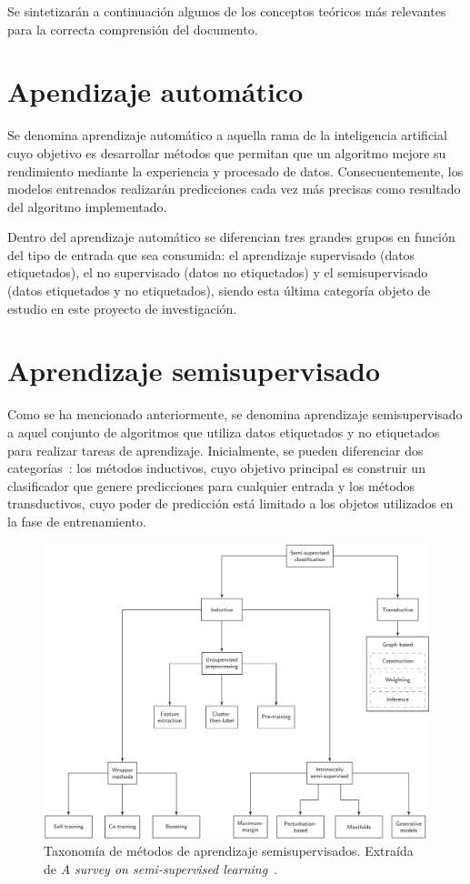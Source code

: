 
Se sintetizarán a continuación algunos de los conceptos teóricos más relevantes para la correcta comprensión del documento.

\section{Apendizaje automático}

Se denomina aprendizaje automático a aquella rama de la inteligencia artificial cuyo objetivo es desarrollar métodos que permitan que un algoritmo mejore su rendimiento mediante la experiencia y procesado de datos. Consecuentemente, los modelos entrenados realizarán predicciones cada vez más precisas como resultado del algoritmo implementado.

Dentro del aprendizaje automático se diferencian tres grandes grupos en función del tipo de entrada que sea consumida: el aprendizaje supervisado (datos etiquetados), el no supervisado (datos no etiquetados) y el semisupervisado (datos etiquetados y no etiquetados), siendo esta última categoría objeto de estudio en este proyecto de investigación. 

\section{Aprendizaje semisupervisado}

Como se ha mencionado anteriormente, se denomina aprendizaje semisupervisado a aquel conjunto de algoritmos que utiliza datos etiquetados y no etiquetados para realizar tareas de aprendizaje. Inicialmente, se pueden diferenciar dos categorías~\cite{engelen2020surveyOnSemiSupervised}: los métodos inductivos, cuyo objetivo principal es construir un clasificador que genere predicciones para cualquier entrada y los métodos transductivos, cuyo poder de predicción está limitado a los objetos utilizados en la fase de entrenamiento.


\begin{figure}[h]
\caption{Taxonomía de métodos de aprendizaje semisupervisados. Extraída de \textit{A survey on semi-supervised learning}~\cite{engelen2020surveyOnSemiSupervised}.}
\centering
\includegraphics[width=\textwidth]{../img/memoria/esquemaHoos}
\end{figure}

